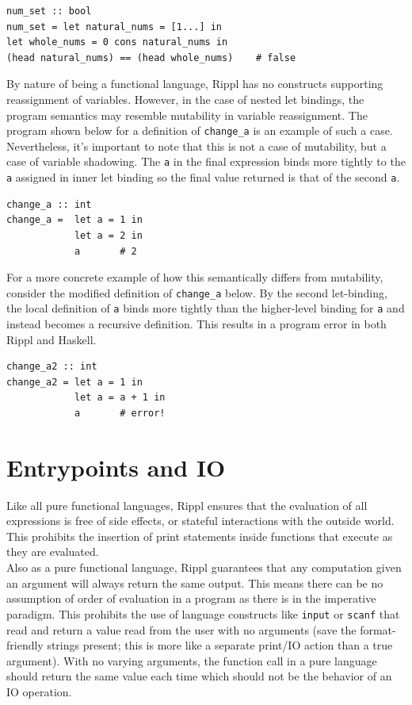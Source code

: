 \documentclass[5pt]{article}
\begin{document}
\begin{lstlisting}[language=rippl]
num_set :: bool
num_set = let natural_nums = [1...] in
let whole_nums = 0 cons natural_nums in
(head natural_nums) == (head whole_nums)    # false
\end{lstlisting}
By nature of being a functional language, Rippl has no constructs supporting reassignment of variables. However, in the case of nested let bindings, the program semantics may resemble mutability in variable reassignment. The program shown below for a definition of \texttt{change\_a} is an example of such a case. Nevertheless, it's important to note that this is not a case of mutability, but a case of variable shadowing. The \texttt{a} in the final expression binds more tightly to the \texttt{a} assigned in inner let binding so the final value returned is that of the second \texttt{a}. \\

\begin{lstlisting}[language=rippl]
change_a :: int
change_a =  let a = 1 in
            let a = 2 in
            a       # 2
\end{lstlisting}
For a more concrete example of how this semantically differs from mutability, consider the modified definition of \texttt{change\_a} below. By the second let-binding, the local definition of \texttt{a} binds more tightly than the higher-level binding for \texttt{a} and instead becomes a recursive definition. This results in a program error in both Rippl and Haskell. \\

\begin{lstlisting}[language=rippl]
change_a2 :: int
change_a2 = let a = 1 in
            let a = a + 1 in
            a       # error!
\end{lstlisting}


\section{Entrypoints and IO}
Like all pure functional languages, Rippl ensures that the evaluation of all expressions is free of side effects, or stateful interactions with the outside world. This prohibits the insertion of print statements inside functions that execute as they are evaluated. \\

\noindent Also as a pure functional language, Rippl guarantees that any computation given an argument will always return the same output. This means there can be no assumption of order of evaluation in a program as there is in the imperative paradigm. This prohibits the use of language constructs like \texttt{input} or \texttt{scanf} that read and return a value read from the user with no arguments (save the format-friendly strings present; this is more like a separate print/IO action than a true argument). With no varying arguments, the function call in a pure language should return the same value each time which should not be the behavior of an IO operation. \\
\end{document}
